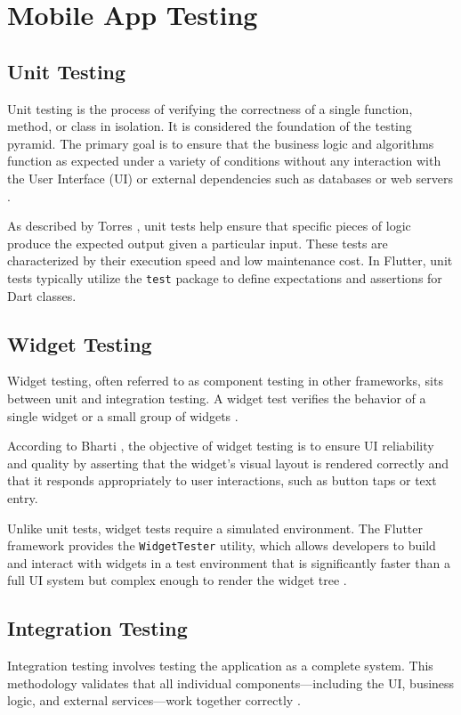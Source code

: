 \section{Mobile App Testing}\label{sec:MobileAppTesting}

\subsection{Unit Testing}
Unit testing is the process of verifying the correctness of a single function,
method, or class in isolation. It is considered the foundation of the testing
pyramid. The primary goal is to ensure that the business logic and algorithms
function as expected under a variety of conditions without any interaction with
the User Interface (UI) or external dependencies such as databases or web
servers \cite{flutterunittest}.

As described by Torres \cite{torres2024testing}, unit tests help ensure that
specific pieces of logic produce the expected output given a particular input.
These tests are characterized by their execution speed and low maintenance
cost. In Flutter, unit tests typically utilize the \texttt{test} package to
define expectations and assertions for Dart classes.

\subsection{Widget Testing}
Widget testing, often referred to as component testing in other frameworks,
sits between unit and integration testing. A widget test verifies the behavior
of a single widget or a small group of widgets \cite{flutterwidgettest}.

According to Bharti \cite{bharti2024widget}, the objective of widget testing is
to ensure UI reliability and quality by asserting that the widget's visual
layout is rendered correctly and that it responds appropriately to user
interactions, such as button taps or text entry.

Unlike unit tests, widget tests require a simulated environment. The Flutter
framework provides the \texttt{WidgetTester} utility, which allows developers
to build and interact with widgets in a test environment that is significantly
faster than a full UI system but complex enough to render the widget tree
\cite{flutterwidgettest}.

\subsection{Integration Testing}
Integration testing involves testing the application as a complete system. This
methodology validates that all individual components—including the UI, business
logic, and external services—work together correctly \cite{torres2024testing}.

